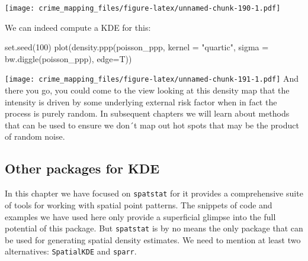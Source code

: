 \documentclass[
  krantz2]{krantz}
\makeatletter
\newenvironment{Shaded}{\begin{snugshade}}{\end{snugshade}}
\newcommand{\AttributeTok}[1]{\textcolor[rgb]{0.61,0.61,0.61}{#1}}
\newcommand{\DecValTok}[1]{\textcolor[rgb]{0.06,0.06,0.06}{#1}}
\newcommand{\FunctionTok}[1]{\textcolor[rgb]{0,0,0}{#1}}
\newcommand{\NormalTok}[1]{#1}
\newcommand{\OtherTok}[1]{\textcolor[rgb]{0.37,0.37,0.37}{#1}}
\newcommand{\SpecialCharTok}[1]{\textcolor[rgb]{0,0,0}{#1}}
\newcommand{\StringTok}[1]{\textcolor[rgb]{0.5,0.5,0.5}{#1}}
\newenvironment{kframe}{%
\medskip{}
\setlength{\fboxsep}{.8em}
 \def\at@end@of@kframe{}%
 \ifinner\ifhmode%
  \def\at@end@of@kframe{\end{minipage}}%
  \begin{minipage}{\columnwidth}%
 \fi\fi%
 \def\FrameCommand##1{\hskip\@totalleftmargin \hskip-\fboxsep
 \colorbox{shadecolor}{##1}\hskip-\fboxsep
     \hskip-\linewidth \hskip-\@totalleftmargin \hskip\columnwidth}%
 \MakeFramed {\advance\hsize-\width
   \@totalleftmargin\z@ \linewidth\hsize
   \@setminipage}}%
 {\par\unskip\endMakeFramed%
 \at@end@of@kframe}
\renewenvironment{Shaded}{\begin{kframe}}{\end{kframe}}
\makeatother
\begin{document}
\begin{Shaded}
\end{Shaded}

\texttt{[image: crime\_mapping\_files/figure-latex/unnamed-chunk-190-1.pdf]}

We can indeed compute a KDE for this:

\begin{Shaded}
\begin{Highlighting}[]
\FunctionTok{set.seed}\NormalTok{(}\DecValTok{100}\NormalTok{)}
\FunctionTok{plot}\NormalTok{(}\FunctionTok{density.ppp}\NormalTok{(poisson\_ppp, }\AttributeTok{kernel =} \StringTok{"quartic"}\NormalTok{,}
                 \AttributeTok{sigma =} \FunctionTok{bw.diggle}\NormalTok{(poisson\_ppp),}
                 \AttributeTok{edge=}\NormalTok{T))}
\end{Highlighting}
\end{Shaded}

\texttt{[image: crime\_mapping\_files/figure-latex/unnamed-chunk-191-1.pdf]}
And there you go, you could come to the view looking at this density map that the intensity is driven by some underlying external risk factor when in fact the process is purely random. In subsequent chapters we will learn about methods that can be used to ensure we don´t map out hot spots that may be the product of random noise.

\hypertarget{other-packages-for-kde}{%
\subsection{Other packages for KDE}\label{other-packages-for-kde}}

In this chapter we have focused on \texttt{spatstat} for it provides a comprehensive suite of tools for working with spatial point patterns. The snippets of code and examples we have used here only provide a superficial glimpse into the full potential of this package. But \texttt{spatstat} is by no means the only package that can be used for generating spatial density estimates. We need to mention at least two alternatives: \texttt{SpatialKDE} and \texttt{sparr}.
\end{document}
